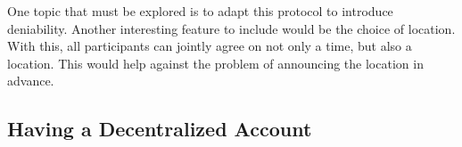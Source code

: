 One topic that must be explored is to adapt this protocol to introduce 
deniability.
Another interesting feature to include would be the choice of location.
With this, all participants can jointly agree on not only a time, but also 
a location.
This would help against the problem of announcing the location in advance.



\subsection{Having a Decentralized Account}
\label{passwd}

